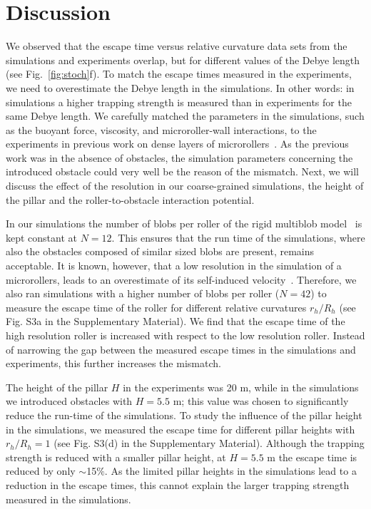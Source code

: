 \documentclass[12pt]{article}
\begin{document}
\section*{Discussion}
\label{sec:discussion}
We observed that the escape time versus relative curvature data sets from the simulations and experiments overlap, but for different values of the Debye length (see Fig.~\ref{fig:stoch}f). To match the escape times measured in the experiments, we need to overestimate the Debye length in the simulations. In other words: in simulations a higher trapping strength is measured than in experiments for the same Debye length.         
We carefully matched the parameters in the simulations, such as the buoyant force, viscosity, and microroller-wall interactions, to the experiments in previous work on dense layers of microrollers~\cite{sprinkle2020active}. As the previous work was in the absence of obstacles,
the simulation parameters concerning the introduced obstacle could very well be the reason of the mismatch. Next, we will discuss the effect of the resolution in our coarse-grained simulations, the height of the pillar and the roller-to-obstacle interaction potential. 

In our simulations the number of blobs per roller of the rigid multiblob model~\cite{balboa2017hydrodynamics} is kept constant at $N=12$. This ensures that the run time of the simulations, where also the obstacles composed of similar sized blobs are present, remains acceptable. It is known, however, that a low resolution in the simulation of a microrollers, leads to an overestimate of its self-induced velocity~\cite{driscoll2017unstable}. Therefore, we also ran simulations with a higher number of blobs per roller ($N=42$) to measure the escape time of the roller for different relative curvatures $r_h/R_h$ (see Fig. S3a in the Supplementary Material). We find that the escape time of the high resolution roller is increased with respect to the low resolution roller. Instead of narrowing the gap between the measured escape times in the simulations and experiments, this further increases the mismatch.

The height of the pillar $H$ in the experiments was 20 \textmu m, while in the simulations we introduced obstacles with $H=5.5$ \textmu m; this value was chosen to significantly reduce the run-time of the simulations. To study the influence of the pillar height in the simulations, we measured the escape time for different pillar heights with $r_h/R_h=1$ (see Fig. S3(d) in the Supplementary Material). Although the trapping strength is reduced with a smaller pillar height, at $H=5.5$ \textmu m the escape time is reduced by only $\sim$15$\%$. As the limited pillar heights in the simulations lead to a reduction in the escape times, this cannot explain the larger trapping strength measured in the simulations.
\end{document}
